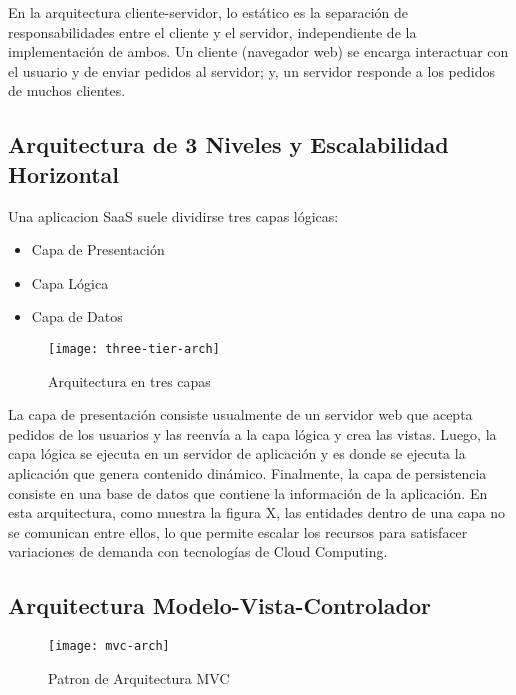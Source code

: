En la arquitectura cliente-servidor, lo estático es la separación de responsabilidades entre el cliente y el servidor, independiente de la implementación de ambos. Un cliente (navegador web) se encarga interactuar con el usuario y de enviar pedidos al servidor; y, un servidor responde a los pedidos de muchos clientes. 
\subsection{Arquitectura de 3 Niveles y Escalabilidad Horizontal}

Una aplicacion SaaS suele dividirse tres capas lógicas:
\begin{itemize}
    \item Capa de Presentación
    \item Capa Lógica
    \item Capa de Datos
\end{itemize}
\begin{figure}[H]
        \centering
        \texttt{[image: three-tier-arch]}
        \caption{Arquitectura en tres capas \protect\cite{Fox2013-ct}}
        \label{fig:three-tier-arch}
    \end{figure}
La capa de presentación consiste usualmente de un servidor web que acepta pedidos de los usuarios y las reenvía a la capa lógica y crea las vistas. Luego, la capa lógica se ejecuta en un servidor de aplicación y es  donde se ejecuta la aplicación que genera contenido dinámico. Finalmente, la capa de persistencia consiste en una base de datos que contiene la información de la aplicación. En esta arquitectura, como muestra la figura X, las entidades dentro de una capa no se comunican entre ellos, lo que permite escalar los recursos para satisfacer variaciones de demanda con tecnologías de Cloud Computing.

\subsection{Arquitectura Modelo-Vista-Controlador}

\begin{figure}[H]
        \centering
        \texttt{[image: mvc-arch]}
        \caption{Patron de Arquitectura MVC \protect\cite{Fowler2012-az}}
        \label{fig:mvc-arch}
    \end{figure}

